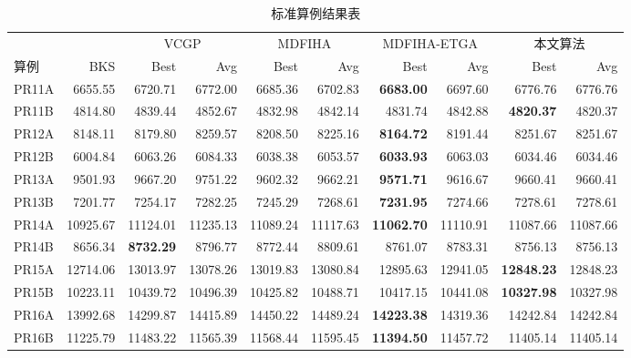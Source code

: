 \documentclass{setp-new}
\begin{document}
\begin{table}[H]
  \centering
  \caption{标准算例结果表}
  \label{tab:benchmark-results}
  \fontsize{6.6pt}{7.0pt}\selectfont
  \renewcommand{\arraystretch}{0.78}
  \setlength{\tabcolsep}{0.7pt}
  \begin{tabular*}{\textwidth}{@{\extracolsep{\fill}}lrrrrrrrrr@{}}
    \toprule
    & & \multicolumn{2}{c}{VCGP\cite{ref:74}} & \multicolumn{2}{c}{MDFIHA\cite{ref:75}} & \multicolumn{2}{c}{MDFIHA-ETGA\cite{ref:75}} & \multicolumn{2}{c}{本文算法}\\
    \cmidrule(lr){3-4}\cmidrule(lr){5-6}\cmidrule(lr){7-8}\cmidrule(lr){9-10}
    算例 & BKS & Best & Avg & Best & Avg & Best & Avg & Best & Avg\\
    \midrule
    PR11A & 6655.55 & 6720.71 & 6772.00 & 6685.36 & 6702.83 & \textbf{6683.00} & 6697.60 & 6776.76 & 6776.76\\
    PR11B & 4814.80 & 4839.44 & 4852.67 & 4832.98 & 4842.14 & 4831.74 & 4842.88 & \textbf{4820.37} & 4820.37\\
    PR12A & 8148.11 & 8179.80 & 8259.57 & 8208.50 & 8225.16 & \textbf{8164.72} & 8191.44 & 8251.67 & 8251.67\\
    PR12B & 6004.84 & 6063.26 & 6084.33 & 6038.38 & 6053.57 & \textbf{6033.93} & 6063.03 & 6034.46 & 6034.46\\
    PR13A & 9501.93 & 9667.20 & 9751.22 & 9602.32 & 9662.21 & \textbf{9571.71} & 9616.67 & 9660.41 & 9660.41\\
    PR13B & 7201.77 & 7254.17 & 7282.25 & 7245.29 & 7268.61 & \textbf{7231.95} & 7274.66 & 7278.61 & 7278.61\\
    PR14A & 10925.67 & 11124.01 & 11235.13 & 11089.24 & 11117.63 & \textbf{11062.70} & 11110.91 & 11087.66 & 11087.66\\
    PR14B & 8656.34 & \textbf{8732.29} & 8796.77 & 8772.44 & 8809.61 & 8761.07 & 8783.31 & 8756.13 & 8756.13\\
    PR15A & 12714.06 & 13013.97 & 13078.26 & 13019.83 & 13080.84 & 12895.63 & 12941.05 & \textbf{12848.23} & 12848.23\\
    PR15B & 10223.11 & 10439.72 & 10496.39 & 10425.82 & 10488.71 & 10417.15 & 10441.08 & \textbf{10327.98} & 10327.98\\
    PR16A & 13992.68 & 14299.87 & 14415.89 & 14450.22 & 14489.24 & \textbf{14223.38} & 14319.36 & 14242.84 & 14242.84\\
    PR16B & 11225.79 & 11483.22 & 11565.39 & 11568.44 & 11595.45 & \textbf{11394.50} & 11457.72 & 11405.14 & 11405.14\\

\end{tabular*}
\end{table}
\end{document}
